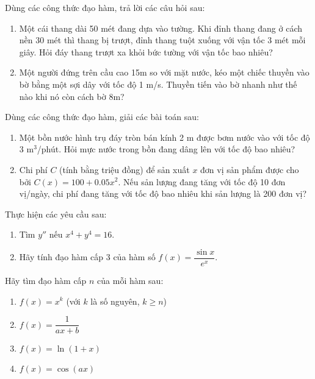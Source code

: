 \begin{exercise} Dùng các công thức đạo hàm, trả lời các câu hỏi sau:
    \begin{enumerate}[label=(\alph*)]
        \item  Một cái thang dài 50 mét đang dựa vào tường. Khi đỉnh thang đang ở cách nền 30 mét thì thang bị trượt, đỉnh thang tuột xuống với vận tốc 3 mét mỗi giây. Hỏi đáy thang trượt xa khỏi bức tường với vận tốc bao nhiêu? %
        \item Một người đứng trên cầu cao 15m so với mặt nước, kéo một chiếc thuyền vào bờ bằng một sợi dây với tốc độ 1 m/s. Thuyền tiến vào bờ nhanh như thế nào khi nó còn cách bờ 8m?
    \end{enumerate}
\end{exercise}

\begin{exercise} Dùng các công thức đạo hàm, giải các bài toán sau:
    \begin{enumerate}[label=(\alph*)]
        \item Một bồn nước hình trụ đáy tròn bán kính 2 m được bơm nước vào với tốc độ 3 m$^3$/phút. Hỏi mực nước trong bồn đang dâng lên với tốc độ bao nhiêu?
        \item Chi phí $C$ (tính bằng triệu đồng) để sản xuất $x$ đơn vị sản phẩm được cho bởi $C(x) = 100 + 0.05x^2$. Nếu sản lượng đang tăng với tốc độ 10 đơn vị/ngày, chi phí đang tăng với tốc độ bao nhiêu khi sản lượng là 200 đơn vị?
    \end{enumerate}
\end{exercise}

\begin{exercise} Thực hiện các yêu cầu sau:
    \begin{enumerate}[label=(\alph*)]
        \item Tìm $y''$ nếu $x^4+y^4=16$.
        \item Hãy tính đạo hàm cấp 3 của hàm số $f(x) = \dfrac{\sin x}{e^x}$.
    \end{enumerate}
\end{exercise}

\begin{exercise} 
    Hãy tìm đạo hàm cấp $n$ của mỗi hàm sau:
    \begin{enumerate}[label=(\alph*)]
        \item $f(x) = x^{k}$ (với $k$ là số nguyên, $k \ge n$)
        \item $f(x) = \dfrac{1}{ax+b}$
        \item $f(x) = \ln(1+x)$
        \item $f(x) = \cos(ax)$
    \end{enumerate}
\end{exercise}


